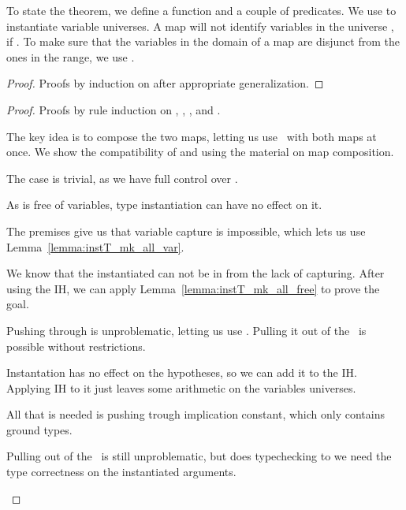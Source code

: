 To state the theorem, we define a function and a couple of predicates.
We use  to instantiate variable universes.
A map \isa{\(\sigma\)} will not identify variables in the universe , if .
To make sure that the variables in the domain of a map \isa{\(\sigma\)} are disjunct from the ones in the range, we use .


\begin{lemma}
\end{lemma}
\begin{lemma}
\end{lemma}
\begin{proof}
    Proofs by induction on  after appropriate generalization.
\end{proof}

\begin{theorem}
\end{theorem}
\begin{proof}
    Proofs by rule induction on \isa{\(\Gamma\)}, \isa{\(\Psi\)}, \isa{\(\Omega\)}, and .
    \begin{description}[]
        \item [\ax] The key idea is to compose the two maps, letting us use \ax\ with both maps at once. We show the compatibility of \isa{\(\Psi\)} and \isa{\(\Omega\)} using the material on map composition.
        \item [\as] The case is trivial, as we have full control over .
        \item [\wk] As  is free of variables, type instantiation can have no effect on it.
        \item [\aIv] The premises give us that variable capture is impossible, which lets us use Lemma~\ref{lemma:instT_mk_all_var}.
        \item [\aIf] We know that the instantiated  can not be in \isa{\(\Gamma\)} from the lack of capturing. After using the IH, we can apply Lemma~\ref{lemma:instT_mk_all_free} to prove the goal.
        \item [\aE] Pushing  through  is unproblematic, letting us use \aE. Pulling it out of the \isasymbullet\ is possible without restrictions.
        \item [\iI] Instantation has no effect on the hypotheses, so we can add it to the IH. Applying IH to it just leaves some arithmetic on the variables universes.
        \item [\iE] All that is needed is pushing  trough implication constant, which only contains ground types.
        \item [\bcnv] Pulling  out of the \isasymbullet\ is still unproblematic, but  does typechecking to we need the type correctness on the instantiated arguments.
    \end{description}
\end{proof}


